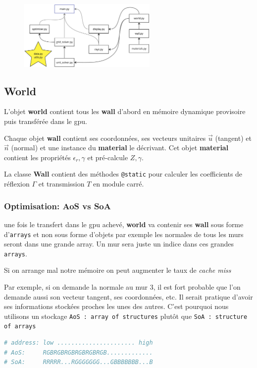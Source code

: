 \documentclass[sn-mathphys-num]{sn-jnl}%
\theoremstyle{thmstyleone}%
\theoremstyle{thmstyletwo}%
\theoremstyle{thmstylethree}%
\begin{document}
\begin{figure}[H]
    \centering
    \includegraphics[width=0.6\textwidth]{images/programme.jpeg}
\end{figure}

\subsection{World}

L'objet \textbf{world} contient tous les \textbf{wall} d'abord en mémoire dynamique provisoire
puis transférée dans le gpu.

Chaque objet \textbf{wall} contient ses coordonnées, ses vecteurs unitaires $\vec{u}$ (tangent)
et $\vec{n}$ (normal) et une instance du \textbf{material} le décrivant.
Cet objet \textbf{material} contient les propriétés $\epsilon_r, \gamma$ et pré-calcule $Z, \gamma$.

La classe \textbf{Wall} contient des méthodes \texttt{@static} pour calculer les coefficients
de réflexion $\Gamma$ et transmission $T$ en module carré.

\subsubsection{Optimisation: AoS vs SoA}
une fois le transfert dans le gpu achevé, 
\textbf{world} va contenir ses \textbf{wall} sous forme 
d'\texttt{arrays} et non sous forme d'objets
par exemple les normales de tous les murs seront dans une grande array.
Un mur sera juste un indice dans ces grandes \texttt{arrays}.

Si on arrange mal notre mémoire on peut augmenter le taux de \textit{cache miss}

Par exemple, si on demande la normale au mur 3, il est fort probable
que l'on demande aussi son vecteur tangent, ses coordonnées, etc. 
Il serait pratique d'avoir ses informations stockées proches 
les unes des autres.
C'est pourquoi nous utilisons un stockage \texttt{AoS : array of structures}
plutôt que \texttt{SoA : structure of arrays}
\begin{lstlisting}[language=python,title=https://docs.taichi-lang.org/docs/layout]
# address: low ...................... high
# AoS:     RGBRGBRGBRGBRGBRGB.............
# SoA:     RRRRR...RGGGGGGG...GBBBBBBB...B    
\end{lstlisting}
\end{document}
